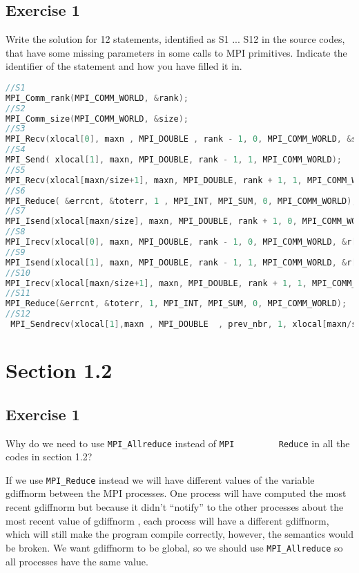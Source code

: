 \documentclass{article}
\newcommand{\incode}[1]{\lstinline[style=c,language=C]{#1}}
\begin{document}
    \subsection{Exercise 1}

    \begin{mdframed}
    Write the solution for 12 statements, identified as S1 ... S12 in the
    source codes, that have some missing parameters in some calls to MPI
    primitives. Indicate the identifier of the statement and how you have
    filled it in.
    \end{mdframed}

    \begin{lstlisting}[style=c, language=C]
//S1
MPI_Comm_rank(MPI_COMM_WORLD, &rank);
//S2
MPI_Comm_size(MPI_COMM_WORLD, &size);
//S3
MPI_Recv(xlocal[0], maxn , MPI_DOUBLE , rank - 1, 0, MPI_COMM_WORLD, &status);
//S4
MPI_Send( xlocal[1], maxn, MPI_DOUBLE, rank - 1, 1, MPI_COMM_WORLD);
//S5
MPI_Recv(xlocal[maxn/size+1], maxn, MPI_DOUBLE, rank + 1, 1, MPI_COMM_WORLD, &status);
//S6
MPI_Reduce( &errcnt, &toterr, 1 , MPI_INT, MPI_SUM, 0, MPI_COMM_WORLD);
//S7
MPI_Isend(xlocal[maxn/size], maxn, MPI_DOUBLE, rank + 1, 0, MPI_COMM_WORLD, &r[nreq++] );
//S8
MPI_Irecv(xlocal[0], maxn, MPI_DOUBLE, rank - 1, 0, MPI_COMM_WORLD, &r[nreq++] );
//S9
MPI_Isend(xlocal[1], maxn, MPI_DOUBLE, rank - 1, 1, MPI_COMM_WORLD, &r[nreq++] );
//S10
MPI_Irecv(xlocal[maxn/size+1], maxn, MPI_DOUBLE, rank + 1, 1, MPI_COMM_WORLD, &r[nreq++]);
//S11
MPI_Reduce(&errcnt, &toterr, 1, MPI_INT, MPI_SUM, 0, MPI_COMM_WORLD);
//S12
 MPI_Sendrecv(xlocal[1],maxn , MPI_DOUBLE  , prev_nbr, 1, xlocal[maxn/size+1], maxn, MPI_DOUBLE, next_nbr, 1, MPI_COMM_WORLD, &status );
    \end{lstlisting}

    \section{Section 1.2}


    \subsection{Exercise 1}

    \begin{mdframed}
        Why do we need to use \incode{MPI_Allreduce} instead of \incode{MPI
        Reduce} in all the codes in section 1.2?
    \end{mdframed}

    If we use \incode{MPI_Reduce} instead we will have different values of the
    variable gdiffnorm between the MPI processes. One process will have
    computed the most recent gdiffnorm but because it didn’t “notify” to the
    other processes about the most recent value of gdiffnorm , each process
    will have a different gdiffnorm, which will still make the program compile
    correctly, however, the semantics would be broken. We want gdiffnorm to be
    global, so we should use \incode{MPI_Allreduce} so all processes have the
    same value.
\end{document}
